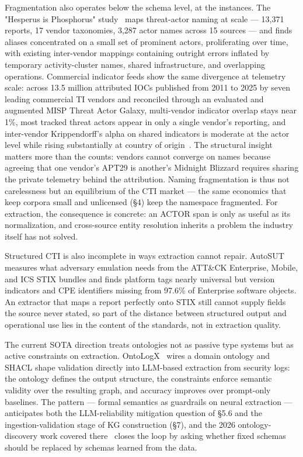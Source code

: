 \documentclass[11pt]{article}
\begin{document}
Fragmentation also operates below the schema level, at the instances. The "Hesperus is Phosphorus" study~\citep{roa2025hesperus} maps threat-actor naming at scale — 13,371 reports, 17 vendor taxonomies, 3,287 actor names across 15 sources — and finds aliases concentrated on a small set of prominent actors, proliferating over time, with existing inter-vendor mappings containing outright errors inflated by temporary activity-cluster names, shared infrastructure, and overlapping operations.
Commercial indicator feeds show the same divergence at telemetry scale: across 13.5 million attributed IOCs published from 2011 to 2025 by seven leading commercial TI vendors and reconciled through an evaluated and augmented MISP Threat Actor Galaxy, multi-vendor indicator overlap stays near 1\%, most tracked threat actors appear in only a single vendor's reporting, and inter-vendor Krippendorff's alpha on shared indicators is moderate at the actor level while rising substantially at country of origin~\citep{ethembabaoglu2026apttodisagree}.
The structural insight matters more than the counts: vendors cannot converge on names because agreeing that one vendor's APT29 is another's Midnight Blizzard requires sharing the private telemetry behind the attribution. Naming fragmentation is thus not carelessness but an equilibrium of the CTI market — the same economics that keep corpora small and unlicensed (§4) keep the namespace fragmented. For extraction, the consequence is concrete: an ACTOR span is only as useful as its normalization, and cross-source entity resolution inherits a problem the industry itself has not solved.

Structured CTI is also incomplete in ways extraction cannot repair. AutoSUT~\citep{barbieri2026autosut} measures what adversary emulation needs from the ATT\&CK Enterprise, Mobile, and ICS STIX bundles and finds platform tags nearly universal but version indicators and CPE identifiers missing from 97.6\% of Enterprise software objects. An extractor that maps a report perfectly onto STIX still cannot supply fields the source never stated, so part of the distance between structured output and operational use lies in the content of the standards, not in extraction quality.

The current SOTA direction treats ontologies not as passive type systems but as active constraints on extraction. OntoLogX~\citep{cotti2025enabling} wires a domain ontology and SHACL shape validation directly into LLM-based extraction from security logs: the ontology defines the output structure, the constraints enforce semantic validity over the resulting graph, and accuracy improves over prompt-only baselines. The pattern — formal semantics as guardrails on neural extraction — anticipates both the LLM-reliability mitigation question of §5.6 and the ingestion-validation stage of KG construction (§7), and the 2026 ontology-discovery work covered there~\citep{kim2026schemaagnostic} closes the loop by asking whether fixed schemas should be replaced by schemas learned from the data.
\end{document}
